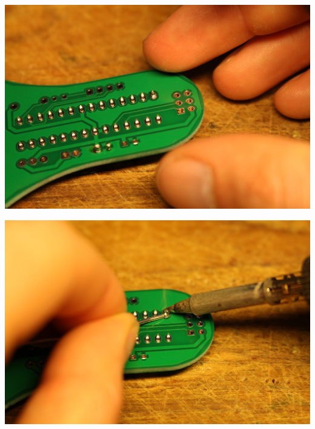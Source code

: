 \documentclass{article}
\begin{document}
\begin{minipage}[b]{0.5\textwidth}
	\includegraphics[width=\textwidth]{Bilder2021/IMG_8132.JPG}
\end{minipage}
\begin{minipage}[b]{0.5\textwidth}
	\includegraphics[width=\textwidth]{Bilder2021/IMG_8133.JPG}
\end{minipage}

\vspace{0.5cm}
\end{document}
